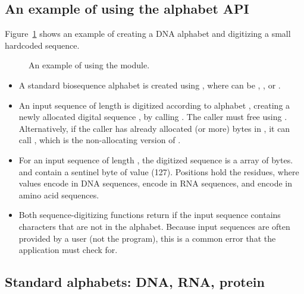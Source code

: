 \subsection{An example of using the alphabet API}

Figure~\ref{fig:alphabet_example} shows an example of creating a DNA
alphabet and digitizing a small hardcoded sequence.

\begin{figure}

\caption{An example of using the  module.}
\label{fig:alphabet_example}
\end{figure}

\begin{itemize}
\item A standard biosequence alphabet is created using
, where  can be
, , or .

\item An input sequence  of length  is digitized
according to alphabet , creating a newly allocated digital
sequence , by calling . The caller must free  using .
Alternatively, if the caller has already allocated  (or
more) bytes in , it can call , which is the non-allocating version of
.

\item For an input sequence of length , the digitized
sequence  is a  array of 
bytes.  and  contain a sentinel byte of
value  (127).  Positions  hold the
residues, where values  encode  in DNA
sequences,  encode  in RNA sequences, and
 encode  in amino acid sequences.

\item Both sequence-digitizing functions return  if
the input sequence contains characters that are not in the
alphabet. Because input sequences are often provided by a user (not
the program), this is a common error that the application must check
for.
\end{itemize}

\subsection{Standard alphabets: DNA, RNA, protein}

